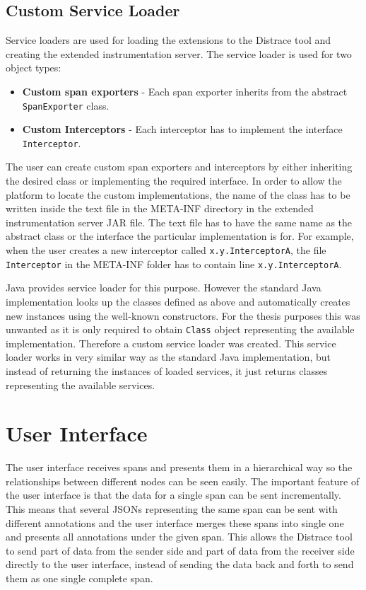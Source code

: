 \subsection{Custom Service Loader}
Service loaders are used for loading the extensions to the Distrace tool and creating the extended instrumentation server. The service loader is used for two object types: 
\begin{itemize}
	\item \textbf{Custom span exporters} - Each span exporter inherits from the abstract \texttt{SpanExporter} class.
	\item \textbf{Custom Interceptors} - Each interceptor has to implement the interface \texttt{Interceptor}.
\end{itemize} 
The user can create custom span exporters and interceptors by either inheriting the desired class or implementing the required interface. In order to allow the platform to locate the custom implementations, the name of the class has to be written inside the text file in the META-INF directory in the extended instrumentation server JAR file. The text file has to have the same name as the abstract class or the interface the particular implementation is for. For example, when the user creates a new interceptor called \texttt{x.y.InterceptorA}, the file \texttt{Interceptor} in the META-INF folder has to contain line \texttt{x.y.InterceptorA}.

Java provides service loader for this purpose. However the standard Java implementation looks up the classes defined as above and automatically creates new instances using the well-known constructors. For the thesis purposes this was unwanted as it is only required to obtain \texttt{Class} object representing the available implementation. Therefore a custom service loader was created. This service loader works in very similar way as the standard Java implementation, but instead of returning the instances of loaded services, it just returns classes representing the available services. 

\section{User Interface}
\label{sec:zipkin_ui}
The user interface receives spans and presents them in a hierarchical way so the relationships between different nodes can be seen easily. The important feature of the user interface is that the data for a single span can be sent incrementally. This means that several JSONs representing the same span can be sent with different annotations and the user interface merges these spans into single one and presents all annotations under the given span. This allows the Distrace tool to send part of data from the sender side and part of data from the receiver side directly to the user interface, instead of sending the data back and forth to send them as one single complete span.

